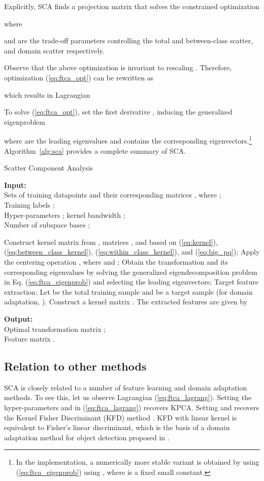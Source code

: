 \documentclass[10pt,journal,compsoc]{IEEEtran}
\renewcommand{\algorithmicrequire}{\textbf{Input:}}
\renewcommand{\algorithmicensure}{\textbf{Output:}}
\begin{document}
Explicitly, SCA finds a projection matrix  that solves the constrained optimization

where 

and  are the trade-off parameters controlling the total and between-class scatter, and domain scatter respectively.

Observe that the above optimization is invariant to rescaling .
Therefore, optimization (\ref{eq:ftca_opt}) can be rewritten as

which results in Lagrangian

To solve (\ref{eq:ftca_opt}), set the first derivative , inducing the generalized eigenproblem

where  are the  leading eigenvalues and  contains the corresponding eigenvectors.\footnote{In the implementation, a numerically more stable variant is obtained by using (\ref{eq:ftca_eigenprob}) using 
,
where  is a fixed small constant.
}
Algorithm~\ref{alg:sca} provides a complete summary of SCA.

\begin{algorithm}[tb]
   \caption{Scatter Component Analysis}
   \label{alg:sca}
	\algorithmicrequire\; \\
		 Sets of training datapoints  and their corresponding matrices , where ; \\
		 Training labels ; \\
		 Hyper-parameters ; kernel bandwidth ; \\
		 Number of subspace bases ;
	\begin{algorithmic}[1]
		\STATE Construct kernel matrix  from , 
			matrices ,  and  based on (\ref{eq:kernel}),  (\ref{eq:between_class_kernel}), (\ref{eq:within_class_kernel}), and (\ref{eq:big_pq});
		\STATE Apply the centering operation 
			,
			where  and ;
		\STATE Obtain the transformation  and its corresponding eigenvalues  by solving the generalized eigendecomposition problem in Eq. (\ref{eq:ftca_eigenprob}) and selecting the  leading eigenvectors;
		\STATE Target feature extraction: Let  be the total training sample and  be a target sample (for domain adaptation, ). Construct a kernel matrix . The extracted features are given by 
	\end{algorithmic}
	\algorithmicensure\; \\
		 Optimal transformation matrix ;\\
		 Feature matrix .
\end{algorithm}

\subsection{Relation to other methods}
\label{s:related}
SCA is closely related to a number of feature learning and domain adaptation methods.
To see this, let us observe Lagrangian (\ref{eq:ftca_lagrang}).
Setting the hyper-parameters  and  in (\ref{eq:ftca_lagrang}) recovers KPCA. 
Setting  and  recovers the Kernel Fisher Discriminant (KFD) method \cite{Mika1999}. 
KFD with linear kernel is equivalent to Fisher's linear discriminant, which is the basis of a domain adaptation method for object detection proposed in \cite{Sun:BMVC2014}.
\end{document}
